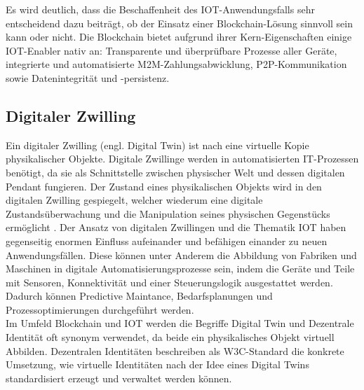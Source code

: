Es wird deutlich, dass die Beschaffenheit des \ac{IOT}-Anwendungsfalls sehr entscheidend dazu beiträgt, ob der Einsatz einer Blockchain-Lösung sinnvoll sein kann oder nicht. Die Blockchain bietet aufgrund ihrer Kern-Eigenschaften einige IOT-Enabler nativ an: Transparente und überprüfbare Prozesse aller Geräte, integrierte und automatisierte \ac{M2M}-Zahlungsabwicklung, \ac{P2P}-Kommunikation sowie Datenintegrität und -persistenz.

\subsection{Digitaler Zwilling}
\label{subsec:fundamentals:iot:digitaltwins}
Ein digitaler Zwilling (engl. Digital Twin) ist nach \cite{deloitte2018} eine virtuelle Kopie physikalischer Objekte. Digitale Zwillinge werden in automatisierten IT-Prozessen benötigt, da sie als Schnittstelle zwischen physischer Welt und dessen digitalen Pendant fungieren. Der Zustand eines physikalischen Objekts wird in den digitalen Zwilling gespiegelt, welcher wiederum eine digitale Zustandsüberwachung und die Manipulation seines physischen Gegenstücks ermöglicht \cite{deloitte2018}. Der Ansatz von digitalen Zwillingen und die Thematik \ac{IOT} haben gegenseitig enormen Einfluss aufeinander und befähigen einander zu neuen Anwendungsfällen. Diese können unter Anderem die Abbildung von Fabriken und Maschinen in digitale Automatisierungsprozesse sein, indem die Geräte und Teile mit Sensoren, Konnektivität und einer Steuerungslogik ausgestattet werden. Dadurch können Predictive Maintance, Bedarfsplanungen und Prozessoptimierungen durchgeführt werden.\\
Im Umfeld Blockchain und \ac{IOT} werden die Begriffe Digital Twin und Dezentrale Identität oft synonym verwendet, da beide ein physikalisches Objekt virtuell Abbilden. Dezentralen Identitäten beschreiben als \ac{W3C}-Standard die konkrete Umsetzung, wie virtuelle Identitäten nach der Idee eines Digital Twins standardisiert erzeugt und verwaltet werden können.

